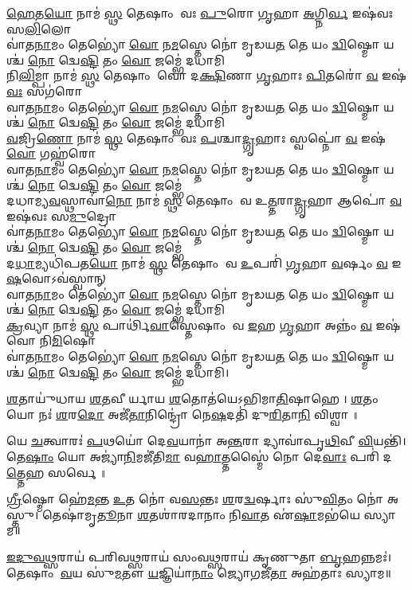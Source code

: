 \ul{𑌹𑍇}𑌤\ul{𑌯𑍋} 𑌨𑌾𑌮॑ \ul{𑌸𑍍𑌥} 𑌤𑍇𑌷𑌾𑌂 𑌵𑌃 \ul{𑌪𑍁}𑌰𑍋 \ul{𑌗𑍃}𑌹𑌾 \ul{𑌅}𑌗𑍍𑌨𑌿\ul{𑌰𑍍𑌵} 𑌇𑌷॑𑌵𑌃 𑌸\ul{𑌲𑌿}𑌲𑍋\\ 
𑌵𑌾॑𑌤\ul{𑌨𑌾}𑌮𑌂 𑌤𑍇𑌭𑍍𑌯𑍋॑ \ul{𑌵𑍋} 𑌨\ul{𑌮}𑌸𑍍𑌤𑍇 𑌨𑍋॑ 𑌮𑍃𑌡𑌯\ul{𑌤} 𑌤𑍇 𑌯𑌂 \ul{𑌦𑍍𑌵𑌿}𑌷𑍍𑌮𑍋 𑌯𑌶𑍍𑌚॑ \ul{𑌨𑍋} 𑌦𑍍𑌵𑍇\ul{𑌷𑍍𑌟𑌿} 𑌤𑌂 \ul{𑌵𑍋} 𑌜𑌮𑍍𑌭𑍇॑ 𑌦𑌧𑌾𑌮𑌿\\
𑌨𑌿\ul{𑌲𑌿}𑌮𑍍𑌪𑌾 𑌨𑌾𑌮॑ \ul{𑌸𑍍𑌥} 𑌤𑍇𑌷𑌾𑌂 𑌵𑍋 𑌦\ul{𑌕𑍍𑌷𑌿}𑌣𑌾 \ul{𑌗𑍃}𑌹𑌾𑌃 \ul{𑌪𑌿}𑌤𑌰𑍋॑ \ul{𑌵} 𑌇𑌷॑\ul{𑌵𑌃} 𑌸𑌗॑𑌰𑍋\\ 
𑌵𑌾𑌤\ul{𑌨𑌾}𑌮𑌂 𑌤𑍇𑌭𑍍𑌯𑍋॑ \ul{𑌵𑍋} 𑌨\ul{𑌮}𑌸𑍍𑌤𑍇 𑌨𑍋॑ 𑌮𑍃𑌡𑌯\ul{𑌤} 𑌤𑍇 𑌯𑌂 \ul{𑌦𑍍𑌵𑌿}𑌷𑍍𑌮𑍋 𑌯𑌶𑍍𑌚॑ \ul{𑌨𑍋} 𑌦𑍍𑌵𑍇\ul{𑌷𑍍𑌟𑌿} 𑌤𑌂 \ul{𑌵𑍋} 𑌜𑌮𑍍𑌭𑍇॑ 𑌦𑌧𑌾𑌮𑌿\\
\ul{𑌵}𑌜𑍍𑌰𑌿\ul{𑌣𑍋} 𑌨𑌾𑌮॑ \ul{𑌸𑍍𑌥} 𑌤𑍇𑌷𑌾𑌂 𑌵𑌃 \ul{𑌪}𑌶𑍍𑌚𑌾\ul{𑌦𑍍𑌗𑍃}𑌹𑌾𑌃 𑌸𑍍𑌵𑌪𑍍𑌨𑍋॑ \ul{𑌵} 𑌇𑌷॑\ul{𑌵𑍋} 𑌗𑌹𑍍𑌵॑𑌰𑍋\\ 
𑌵𑌾𑌤\ul{𑌨𑌾}𑌮𑌂 𑌤𑍇𑌭𑍍𑌯𑍋॑ \ul{𑌵𑍋} 𑌨\ul{𑌮}𑌸𑍍𑌤𑍇 𑌨𑍋॑ 𑌮𑍃𑌡𑌯\ul{𑌤} 𑌤𑍇 𑌯𑌂 \ul{𑌦𑍍𑌵𑌿}𑌷𑍍𑌮𑍋 𑌯𑌶𑍍𑌚॑ \ul{𑌨𑍋} 𑌦𑍍𑌵𑍇\ul{𑌷𑍍𑌟𑌿} 𑌤𑌂 \ul{𑌵𑍋} 𑌜𑌮𑍍𑌭𑍇॑\\
𑌦𑌧𑌾𑌮𑍍𑌯\ul{𑌵}𑌸𑍍𑌥𑌾𑌵𑌾॑\ul{𑌨𑍋} 𑌨𑌾𑌮॑ \ul{𑌸𑍍𑌥} 𑌤𑍇𑌷𑌾𑌂 𑌵 𑌉\ul{𑌤𑍍𑌤}𑌰𑌾\ul{𑌦𑍍𑌗𑍃}𑌹𑌾 𑌆𑌪𑍋॑ \ul{𑌵} 𑌇𑌷॑𑌵𑌃 𑌸\ul{𑌮𑍁}𑌦𑍍𑌰𑍋\\ 
𑌵𑌾॑𑌤\ul{𑌨𑌾}𑌮𑌂 𑌤𑍇𑌭𑍍𑌯𑍋॑ \ul{𑌵𑍋} 𑌨\ul{𑌮}𑌸𑍍𑌤𑍇 𑌨𑍋॑ 𑌮𑍃𑌡𑌯\ul{𑌤} 𑌤𑍇 𑌯𑌂 \ul{𑌦𑍍𑌵𑌿}𑌷𑍍𑌮𑍋 𑌯𑌶𑍍𑌚॑ \ul{𑌨𑍋} 𑌦𑍍𑌵𑍇\ul{𑌷𑍍𑌟𑌿} 𑌤𑌂 \ul{𑌵𑍋} 𑌜𑌮𑍍𑌭𑍇॑\\
𑌦\ul{𑌧𑌾}𑌮𑍍𑌯𑌧𑌿॑𑌪𑌤\ul{𑌯𑍋} 𑌨𑌾𑌮॑ \ul{𑌸𑍍𑌥} 𑌤𑍇𑌷𑌾𑌂 𑌵 \ul{𑌉}𑌪𑌰𑌿॑ \ul{𑌗𑍃}𑌹𑌾 \ul{𑌵}𑌰𑍍\mbox{}𑌷𑌂 \ul{𑌵} 𑌇\ul{𑌷}𑌵𑍋𑌽𑌵॑𑌸𑍍𑌵𑌾𑌨𑍍\\ 
𑌵𑌾𑌤\ul{𑌨𑌾}𑌮𑌂 𑌤𑍇𑌭𑍍𑌯𑍋॑ \ul{𑌵𑍋} 𑌨\ul{𑌮}𑌸𑍍𑌤𑍇 𑌨𑍋॑ 𑌮𑍃𑌡𑌯\ul{𑌤} 𑌤𑍇 𑌯𑌂 \ul{𑌦𑍍𑌵𑌿}𑌷𑍍𑌮𑍋 𑌯𑌶𑍍𑌚॑ \ul{𑌨𑍋} 𑌦𑍍𑌵𑍇\ul{𑌷𑍍𑌟𑌿} 𑌤𑌂 \ul{𑌵𑍋} 𑌜𑌮𑍍𑌭𑍇॑ 𑌦𑌧𑌾𑌮𑌿\\
\ul{𑌕𑍍𑌰}𑌵𑍍𑌯𑌾 𑌨𑌾𑌮॑ \ul{𑌸𑍍𑌥} 𑌪𑌾𑌰𑍍𑌥𑌿॑\ul{𑌵𑌾}𑌸𑍍𑌤𑍇𑌷𑌾𑌂 𑌵 \ul{𑌇}𑌹 \ul{𑌗𑍃}𑌹𑌾 𑌅𑌨𑍍𑌨𑌂॑ \ul{𑌵} 𑌇𑌷॑𑌵𑍋 𑌨𑌿\ul{𑌮𑌿}𑌷𑍋\\ 
𑌵𑌾॑𑌤\ul{𑌨𑌾}𑌮𑌂 𑌤𑍇𑌭𑍍𑌯𑍋॑ \ul{𑌵𑍋} 𑌨\ul{𑌮}𑌸𑍍𑌤𑍇 𑌨𑍋॑ 𑌮𑍃𑌡𑌯\ul{𑌤} 𑌤𑍇 𑌯𑌂 \ul{𑌦𑍍𑌵𑌿}𑌷𑍍𑌮𑍋 𑌯𑌶𑍍𑌚॑ \ul{𑌨𑍋} 𑌦𑍍𑌵𑍇\ul{𑌷𑍍𑌟𑌿} 𑌤𑌂 \ul{𑌵𑍋} 𑌜𑌮𑍍𑌭𑍇॑ 𑌦𑌧𑌾𑌮𑌿।

\ul{𑌶}𑌤𑌾𑌯𑍁॑𑌧𑌾𑌯 \ul{𑌶}𑌤𑌵𑍀𑌰𑍍𑌯𑌾𑌯 \ul{𑌶}𑌤𑍋𑌤॑𑌯𑍇𑌽𑌭𑌿𑌮𑌾\ul{𑌤𑌿}𑌷𑌾𑌹𑍇।
\ul{𑌶}𑌤𑌂 𑌯𑍋 𑌨𑌃॑ \ul{𑌶}𑌰\ul{𑌦𑍋} 𑌅𑌜𑍀॑\ul{𑌤𑌾}𑌨𑌿𑌨𑍍𑌦𑍍𑌰𑍋॑ 𑌨𑍇\ul{𑌷}𑌦𑌤𑌿॑ 𑌦𑍁\ul{𑌰𑌿}𑌤𑌾\ul{𑌨𑌿} 𑌵𑌿𑌶𑍍𑌵𑌾॥

𑌯𑍇 \ul{𑌚}𑌤𑍍𑌵𑌾𑌰𑌃॑ \ul{𑌪}𑌥𑌯𑍋॑ 𑌦𑍇\ul{𑌵}𑌯𑌾𑌨𑌾॑ 𑌅\ul{𑌨𑍍𑌤}𑌰𑌾 𑌦𑍍𑌯𑌾𑌵𑌾॑𑌪𑍃\ul{𑌥𑌿}𑌵𑍀 \ul{𑌵𑌿}𑌯𑌨𑍍𑌤𑌿॑।
𑌤𑍇\ul{𑌷𑌾𑌂} 𑌯𑍋 𑌅𑌜𑍍𑌯𑌾॑\ul{𑌨𑌿}𑌮𑌜𑍀॑𑌤𑌿\ul{𑌮𑌾} 𑌵\ul{𑌹𑌾}𑌤𑍍𑌤𑌸𑍍𑌮𑍈॑ 𑌨𑍋 𑌦𑍇\ul{𑌵𑌾𑌃} 𑌪𑌰𑌿॑ 𑌦\ul{𑌤𑍍𑌤𑍇}𑌹 𑌸𑌰𑍍𑌵𑍇॥

\ul{𑌗𑍍𑌰𑍀}𑌷𑍍𑌮𑍋 𑌹𑍇॑\ul{𑌮}𑌨𑍍𑌤 \ul{𑌉}𑌤 𑌨𑍋॑ 𑌵\ul{𑌸}𑌨𑍍𑌤𑌃 \ul{𑌶}𑌰\ul{𑌦𑍍𑌵}𑌰𑍍𑌷𑌾𑌃 𑌸𑍁॑\ul{𑌵𑌿}𑌤𑌂 𑌨𑍋॑ 𑌅𑌸𑍍𑌤𑍁।
𑌤𑍇𑌷𑌾॑𑌮𑍃\ul{𑌤𑍂}𑌨𑌾 \ul{𑌶}𑌤𑌶𑌾॑𑌰𑌦𑌾𑌨𑌾𑌂 𑌨𑌿\ul{𑌵𑌾}𑌤 𑌏॑\ul{𑌷𑌾}𑌮𑌭॑𑌯𑍇 𑌸𑍍𑌯𑌾𑌮॥

\ul{𑌇}\ul{𑌦𑍁}\ul{𑌵}\ul{𑌥𑍍𑌸}𑌰𑌾𑌯॑ 𑌪𑌰𑌿𑌵\ul{𑌥𑍍𑌸}𑌰𑌾𑌯॑ 𑌸𑌂𑌵\ul{𑌥𑍍𑌸}𑌰𑌾𑌯॑ 𑌕𑍃𑌣𑍁𑌤𑌾 \ul{𑌬𑍃}𑌹𑌨𑍍𑌨𑌮𑌃॑।
𑌤𑍇𑌷𑌾𑌂 \ul{𑌵}𑌯 𑌸𑍁॑\ul{𑌮}𑌤𑍗 \ul{𑌯}𑌜𑍍𑌞𑌿𑌯𑌾॑\ul{𑌨𑌾𑌂} 𑌜𑍍𑌯𑍋𑌗𑌜𑍀॑\ul{𑌤𑌾} 𑌅𑌹॑𑌤𑌾𑌃 𑌸𑍍𑌯𑌾𑌮॥

